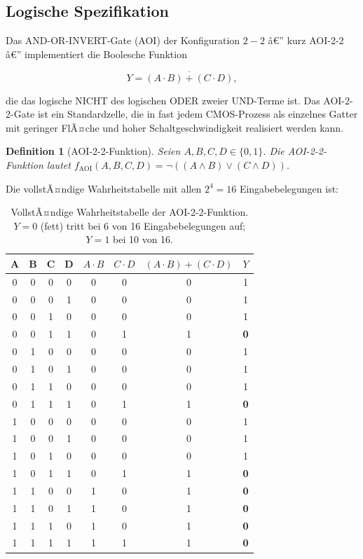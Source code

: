 ﻿\documentclass[12pt,a4paper]{report}
\newtheorem{definition}{Definition}[section]
\begin{document}
\subsection{Logische Spezifikation}

Das AND-OR-INVERT-Gate (AOI) der Konfiguration $2{-}2$ â€” kurz AOI-2-2 â€”
implementiert die Boolesche Funktion

\begin{equation}
    Y = \overline{(A \cdot B) + (C \cdot D)},
    \label{eq:aoi22}
\end{equation}

die das logische NICHT des logischen ODER zweier UND-Terme ist.
Das AOI-2-2-Gate ist ein Standardzelle, die in fast jedem CMOS-Prozess
als einzelnes Gatter mit geringer FlÃ¤che und hoher Schaltgeschwindigkeit
realisiert werden kann.

\begin{definition}[AOI-2-2-Funktion]
Seien $A, B, C, D \in \{0, 1\}$. Die AOI-2-2-Funktion lautet
$f_{\mathrm{AOI}}(A, B, C, D) = \neg((A \wedge B) \vee (C \wedge D))$.
\end{definition}

Die vollstÃ¤ndige Wahrheitstabelle mit allen $2^4 = 16$ Eingabebelegungen ist:

\begin{table}[H]
\centering
\small
\begin{tabular}{|c|c|c|c||c|c|c||c|}
\hline
\textbf{A} & \textbf{B} & \textbf{C} & \textbf{D} & $A \cdot B$ & $C \cdot D$ & $(A \cdot B)+(C \cdot D)$ & $Y$ \\
\hline
0&0&0&0&0&0&0&1\\
0&0&0&1&0&0&0&1\\
0&0&1&0&0&0&0&1\\
0&0&1&1&0&1&1&\textbf{0}\\
0&1&0&0&0&0&0&1\\
0&1&0&1&0&0&0&1\\
0&1&1&0&0&0&0&1\\
0&1&1&1&0&1&1&\textbf{0}\\
1&0&0&0&0&0&0&1\\
1&0&0&1&0&0&0&1\\
1&0&1&0&0&0&0&1\\
1&0&1&1&0&1&1&\textbf{0}\\
1&1&0&0&1&0&1&\textbf{0}\\
1&1&0&1&1&0&1&\textbf{0}\\
1&1&1&0&1&0&1&\textbf{0}\\
1&1&1&1&1&1&1&\textbf{0}\\
\hline
\end{tabular}
\caption{VollstÃ¤ndige Wahrheitstabelle der AOI-2-2-Funktion. $Y=0$ (fett) tritt
bei 6 von 16 Eingabebelegungen auf; $Y=1$ bei 10 von 16.}
\label{tab:aoi_wahrheit}
\end{table}
\end{document}
